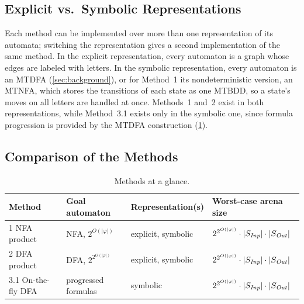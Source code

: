 \subsection{Explicit vs.\ Symbolic Representations}
Each method can be implemented over more than one representation of its automata; switching the representation gives a second implementation of the same method.
In the explicit representation, every automaton is a graph whose edges are labeled with letters.
In the symbolic representation, every automaton is an MTDFA (\cref{sec:background}), or for Method~1 its nondeterministic version, an MTNFA, which stores the transitions of each state as one MTBDD, so a state's moves on all letters are handled at once.
Methods~1 and~2 exist in both representations, while Method~3.1 exists only in the symbolic one, since formula progression is provided by the MTDFA construction (\cref{tab:methods}).

\subsection{Comparison of the Methods}
\begin{table}[H]
\centering
\caption{Methods at a glance.}\label{tab:methods}
\begin{tabular}{llll}
\toprule
Method & Goal automaton & Representation(s) & Worst-case arena size \\
\midrule
1 NFA product      & NFA, $2^{O(|\varphi|)}$       & explicit, symbolic & $2^{2^{O(|\varphi|)}} \cdot |S_{\mathit{Inp}}| \cdot |S_{\mathit{Out}}|$ \\
2 DFA product      & DFA, $2^{2^{O(|\varphi|)}}$   & explicit, symbolic & $2^{2^{O(|\varphi|)}} \cdot |S_{\mathit{Inp}}| \cdot |S_{\mathit{Out}}|$ \\
3.1 On-the-fly DFA & progressed formulas           & symbolic           & $2^{2^{O(|\varphi|)}} \cdot |S_{\mathit{Inp}}| \cdot |S_{\mathit{Out}}|$ \\
\bottomrule
\end{tabular}
\end{table}
